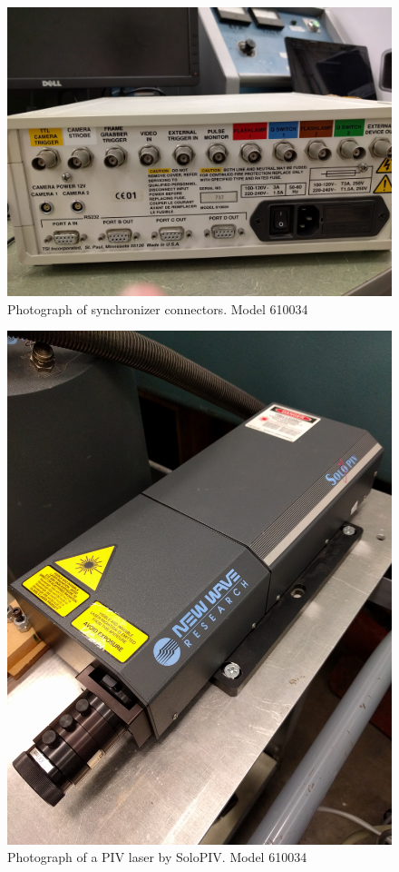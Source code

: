 \begin{figure}[H]
	\centering
	\includegraphics[width=5in]{figs/piv_method/synchronizer_rear}
	\caption{Photograph of synchronizer connectors. Model 610034}
	\label{fig:synchronizer2}
\end{figure}

\begin{figure}[H]
	\centering
	\includegraphics[width=5in]{figs/piv_method/laser}
	\caption{Photograph of a PIV laser by SoloPIV. Model 610034}
	\label{fig:laser}
\end{figure}

